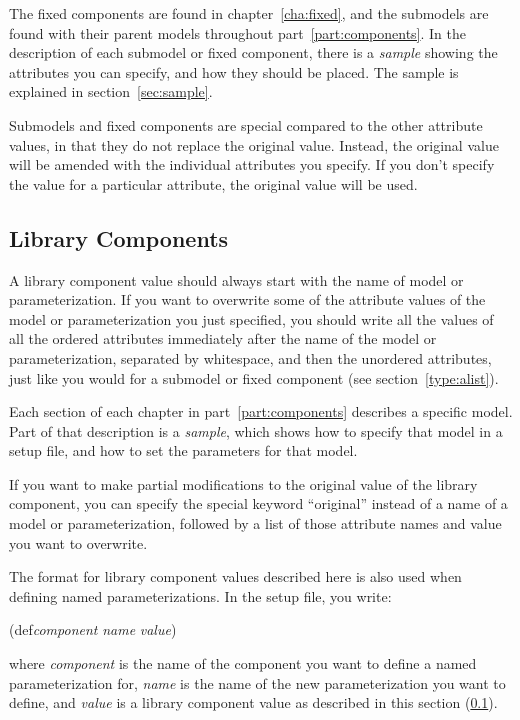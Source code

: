 The fixed components are found in chapter~\ref{cha:fixed}, and the
submodels are found with their parent models throughout
part~\ref{part:components}.  In the description of each submodel or
fixed component, there is a \emph{sample} showing the attributes you
can specify, and how they should be placed.  The sample is explained in
section~\ref{sec:sample}. 

Submodels and fixed components are special compared to the other
attribute values, in that they do not replace the original value.
Instead, the original value will be amended with the individual
attributes you specify.  If you don't specify the value for a
particular attribute, the original value will be used.  

\subsection{Library Components}
\label{type:object}

A library component value should always start with the name of model
or parameterization.  If you want to overwrite some of the attribute
values of the model or parameterization you just specified, you should
write all the values of all the ordered attributes immediately after
the name of the model or parameterization, separated by whitespace,
and then the unordered attributes, just like you would for a submodel
or fixed component (see section~\ref{type:alist}).

Each section of each chapter in part~\ref{part:components} describes a
specific model.  Part of that description is a \emph{sample}, which
shows how to specify that model in a setup file, and how to set the
parameters for that model.

If you want to make partial modifications to the original value of the
library component, you can specify the special keyword ``original''
instead of a name of a model or parameterization, followed by a list
of those attribute names and value you want to overwrite.

The format for library component values described here is also used
when defining named parameterizations.  In the setup file, you
write: 

\begin{tt}
  (def\emph{component} \emph{name} \emph{value})
\end{tt}

where \emph{component} is the name of the component you want to define
a named parameterization for, \emph{name} is the name of the new
parameterization you want to define, and \emph{value} is a library
component value as described in this section (\ref{type:object}).

